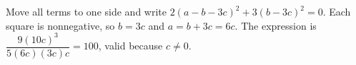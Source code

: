 Move all terms to one side and write $2(a-b-3c)^2+3(b-3c)^2=0$. Each square is nonnegative, so $b=3c$ and $a=b+3c=6c$. The expression is $\dfrac{9(10c)^3}{5(6c)(3c)c}=\boxed{100}$, valid because $c\ne0$.
